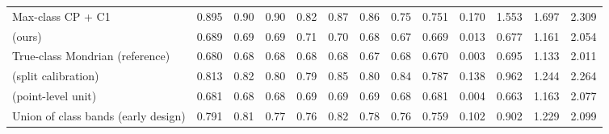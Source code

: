 \begin{table}[!htbp]
{\begin{tabular}{lcccccccccccc}
Max-class CP + C1 & 0.895 & 0.90 & 0.90 & 0.82 & 0.87 & 0.86 & 0.75 & 0.751 & 0.170 & 1.553 & 1.697 & 2.309 \\
\gamut{} (ours) & 0.689 & 0.69 & 0.69 & 0.71 & 0.70 & 0.68 & 0.67 & 0.669 & 0.013 & 0.677 & 1.161 & 2.054 \\
True-class Mondrian (reference) & 0.680 & 0.68 & 0.68 & 0.68 & 0.68 & 0.67 & 0.68 & 0.670 & 0.003 & 0.695 & 1.133 & 2.011 \\
\gamut{} (split calibration) & 0.813 & 0.82 & 0.80 & 0.79 & 0.85 & 0.80 & 0.84 & 0.787 & 0.138 & 0.962 & 1.244 & 2.264 \\
\gamut{} (point-level unit) & 0.681 & 0.68 & 0.68 & 0.69 & 0.69 & 0.69 & 0.68 & 0.681 & 0.004 & 0.663 & 1.163 & 2.077 \\
Union of class bands (early design) & 0.791 & 0.81 & 0.77 & 0.76 & 0.82 & 0.78 & 0.76 & 0.759 & 0.102 & 0.902 & 1.229 & 2.099 \\
\bottomrule
\end{tabular}}
\end{table}
\FloatBarrier


